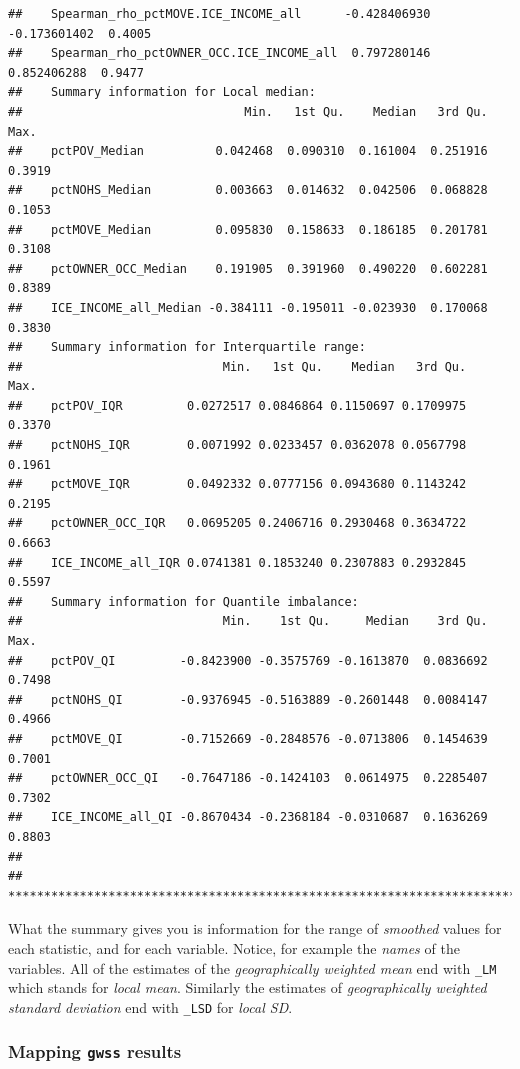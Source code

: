 \documentclass[
]{book}
\begin{document}
\begin{verbatim}
##    Spearman_rho_pctMOVE.ICE_INCOME_all      -0.428406930 -0.173601402  0.4005
##    Spearman_rho_pctOWNER_OCC.ICE_INCOME_all  0.797280146  0.852406288  0.9477
##    Summary information for Local median:
##                               Min.   1st Qu.    Median   3rd Qu.   Max.
##    pctPOV_Median          0.042468  0.090310  0.161004  0.251916 0.3919
##    pctNOHS_Median         0.003663  0.014632  0.042506  0.068828 0.1053
##    pctMOVE_Median         0.095830  0.158633  0.186185  0.201781 0.3108
##    pctOWNER_OCC_Median    0.191905  0.391960  0.490220  0.602281 0.8389
##    ICE_INCOME_all_Median -0.384111 -0.195011 -0.023930  0.170068 0.3830
##    Summary information for Interquartile range:
##                            Min.   1st Qu.    Median   3rd Qu.   Max.
##    pctPOV_IQR         0.0272517 0.0846864 0.1150697 0.1709975 0.3370
##    pctNOHS_IQR        0.0071992 0.0233457 0.0362078 0.0567798 0.1961
##    pctMOVE_IQR        0.0492332 0.0777156 0.0943680 0.1143242 0.2195
##    pctOWNER_OCC_IQR   0.0695205 0.2406716 0.2930468 0.3634722 0.6663
##    ICE_INCOME_all_IQR 0.0741381 0.1853240 0.2307883 0.2932845 0.5597
##    Summary information for Quantile imbalance:
##                            Min.    1st Qu.     Median    3rd Qu.   Max.
##    pctPOV_QI         -0.8423900 -0.3575769 -0.1613870  0.0836692 0.7498
##    pctNOHS_QI        -0.9376945 -0.5163889 -0.2601448  0.0084147 0.4966
##    pctMOVE_QI        -0.7152669 -0.2848576 -0.0713806  0.1454639 0.7001
##    pctOWNER_OCC_QI   -0.7647186 -0.1424103  0.0614975  0.2285407 0.7302
##    ICE_INCOME_all_QI -0.8670434 -0.2368184 -0.0310687  0.1636269 0.8803
## 
##    ************************************************************************
\end{verbatim}

What the summary gives you is information for the range of \emph{smoothed} values for each statistic, and for each variable. Notice, for example the \emph{names} of the variables. All of the estimates of the \emph{geographically weighted mean} end with \texttt{\_LM} which stands for \emph{local mean}. Similarly the estimates of \emph{geographically weighted standard deviation} end with \texttt{\_LSD} for \emph{local SD}.

\hypertarget{mapping-gwss-results}{%
\subsubsection{\texorpdfstring{Mapping \texttt{gwss} results}{Mapping gwss results}}\label{mapping-gwss-results}}
\end{document}
